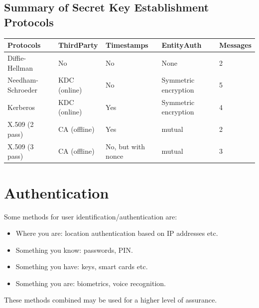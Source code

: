 \documentclass{article}
\begin{document}
\subsection{Summary of Secret Key Establishment Protocols}
\begin{center}
  \begin{tabular}{|p{2.5cm}|p{2.5cm}|p{2.5cm}|p{4cm}|p{2cm}|}
    \hline
    Protocols & ThirdParty & Timestamps & EntityAuth & Messages \\ \hline
    Diffie-Hellman & No & No & None & 2 \\ \hline
    Needham-Schroeder & KDC (online) & No & Symmetric encryption & 5 \\ \hline
    Kerberos & KDC (online) & Yes & Symmetric encryption & 4 \\ \hline
    X.509 (2 pass) & CA (offline) & Yes & mutual & 2 \\ \hline
    X.509 (3 pass) & CA (offline) & No, but with nonce & mutual & 3 \\
    \hline
  \end{tabular}
\end{center}

\section{Authentication}
Some methods for user identification/authentication are:
\begin{itemize}
  \item Where you are: location authentication based on IP addresses etc.
  \item Something you know: passwords, PIN.
  \item Something you have: keys, smart cards etc.
  \item Something you are: biometrics, voice recognition.
\end{itemize}
These methods combined may be used for a higher level of assurance.
\end{document}
